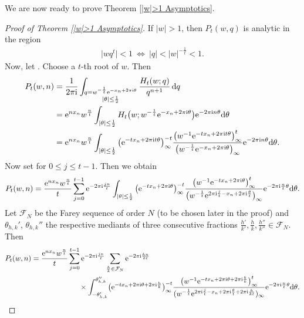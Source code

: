 We are now ready to prove Theorem \ref{|w|>1 Asymptotics}.


\begin{proof}[Proof of Theorem \ref{|w|>1 Asymptotics}] If $|w|>1$, then $P_t(w,q)$ is analytic in the region
 \begin{align*}
 \bigl|wq^t\bigr|<1 \ \iff\  |q|< |w|^{-\frac{1}{t}}<1.
 \end{align*}
 Now, let . Choose a $t$-th root of $w$. Then
 \begin{align*}
 P_t(w,n)&{}=\frac{1}{2\pi {\rm i}} \int_{\substack{q=w^{-\frac{1}{t}}{\rm e}^{-x_n+2\pi {\rm i} \theta} \\ |\theta|\leq \frac{1}{2}}} \frac{H_t(w;q)}{q^{n+1}} \,{\rm d}q \\
 &{}={\rm e}^{nx_n}w^{\frac{n}{t}}\int_{|\theta|\leq \frac{1}{2}} H_t\big(w;w^{-\frac{1}{t}}{\rm e}^{-x_n+2\pi {\rm i} \theta}\big){\rm e}^{-2\pi {\rm i} n \theta} {\rm d}\theta \\
 &{}={\rm e}^{nx_n}w^{\frac{n}{t}}\int_{|\theta|\leq \frac{1}{2}} \big({\rm e}^{-tx_n+2\pi {\rm i} t \theta}\big)_{\infty}^{-t}\frac{\big(w^{-1}{\rm e}^{-tx_n+2\pi {\rm i} t \theta}\big)_{\infty}^t}{\big(w^{-\frac{1}{t}}{\rm e}^{-x_n+2\pi {\rm i} \theta}\big)_{\infty}}{\rm e}^{-2\pi {\rm i} n \theta} {\rm d}\theta.
 \end{align*}
 Now set  for $0\leq j \leq t-1$. Then we obtain
 \begin{align*}
 P_t(w,n)
 =\frac{{\rm e}^{nx_n}w^{\frac{n}{t}}}{t}\sum_{j=0}^{ t-1}{\rm e}^{-2\pi {\rm i} \frac{jn}{t}}\int_{|\theta|\leq \frac{1}{2}} \big({\rm e}^{-tx_n+2\pi {\rm i} \theta}\big)_{\infty}^{-t}\frac{\big(w^{-1}{\rm e}^{-tx_n+2\pi {\rm i} \theta}\big)_{\infty}^t}{\big(w^{-\frac{1}{t}}{\rm e}^{2\pi {\rm i} \frac{j}{t}-x_n+2\pi {\rm i} \frac{\theta}{t}}\big)_{\infty}}{\rm e}^{-2\pi {\rm i} \frac{n}{t} \theta} {\rm d}\theta.
 \end{align*}
 Let $\mathcal{F}_N$ be the Farey sequence of order $N$ (to be chosen later in the proof) and $\theta_{h,k}'$, $\theta_{h,k}''$ the respective mediants of three consecutive fractions $\frac{h'}{k'},\frac{h}{k},\frac{h''}{k''} \in \mathcal{F}_N$. Then
 \begin{align*}
 P_t(w,n)
 &{}=\frac{{\rm e}^{nx_n}w^{\frac{n}{t}}}{t}\sum_{j=0}^{ t-1}{\rm e}^{-2\pi {\rm i} \frac{jn}{t}} \sum_{\frac{h}{k} \in \mathcal{F}_N} {\rm e}^{-2\pi {\rm i} \frac{hn}{kt}} \\
 &\hphantom{=\frac{{\rm e}^{nx_n}w^{\frac{n}{t}}}{t}\sum_{j=0}^{ t-1}}\,{} \times \int_{-\theta_{h,k}'}^{\theta_{h,k}''} \!\big({\rm e}^{-tx_n+2\pi {\rm i} \theta+2\pi {\rm i} \frac{h}{k}}\big)_{\infty}^{-t}\frac{\big(w^{-1}{\rm e}^{-tx_n+2\pi {\rm i} \theta+2\pi {\rm i} \frac{h}{k}}\big)_{\infty}^t}{(w^{-\frac{1}{t}}{\rm e}^{2\pi {\rm i} \frac{j}{t}-x_n+2\pi {\rm i} \frac{\theta}{t}+2\pi {\rm i} \frac{h}{kt}})_{\infty}}{\rm e}^{-2\pi {\rm i} \frac{n}{t} \theta} {\rm d}\theta.

\end{align*}
\end{proof}
